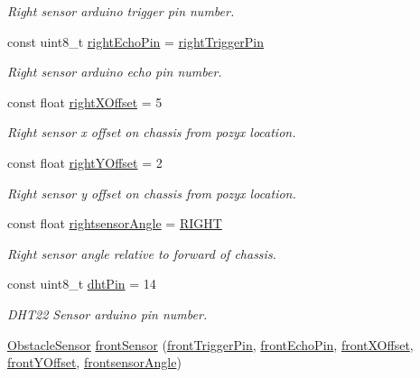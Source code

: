 \begin{DoxyCompactItemize}
\begin{DoxyCompactList}\small\item\em Right sensor arduino trigger pin number. \end{DoxyCompactList}\item 
const uint8\+\_\+t \mbox{\hyperlink{bot_main_8ino_a513a215c9894c01e37f389b072c5cec4}{right\+Echo\+Pin}} = \mbox{\hyperlink{bot_main_8ino_a906054d9d48970211789ac841d331898}{right\+Trigger\+Pin}}
\begin{DoxyCompactList}\small\item\em Right sensor arduino echo pin number. \end{DoxyCompactList}\item 
const float \mbox{\hyperlink{bot_main_8ino_ac932cddb5bc68094c96d0034c92faef9}{right\+X\+Offset}} = 5
\begin{DoxyCompactList}\small\item\em Right sensor x offset on chassis from pozyx location. \end{DoxyCompactList}\item 
const float \mbox{\hyperlink{bot_main_8ino_a07903b96b48e8e456debd9cc43c7af05}{right\+Y\+Offset}} = 2
\begin{DoxyCompactList}\small\item\em Right sensor y offset on chassis from pozyx location. \end{DoxyCompactList}\item 
const float \mbox{\hyperlink{bot_main_8ino_a83724535498f068d5b44150a2bc4fcf8}{rightsensor\+Angle}} = \mbox{\hyperlink{bot_main_8ino_a80fb826a684cf3f0d306b22aa100ddac}{R\+I\+G\+HT}}
\begin{DoxyCompactList}\small\item\em Right sensor angle relative to forward of chassis. \end{DoxyCompactList}\item 
const uint8\+\_\+t \mbox{\hyperlink{bot_main_8ino_a89e40ffdf0114ea60292ff57879491e2}{dht\+Pin}} = 14
\begin{DoxyCompactList}\small\item\em D\+H\+T22 Sensor arduino pin number. \end{DoxyCompactList}\item 
\mbox{\hyperlink{class_obstacle_sensor}{Obstacle\+Sensor}} \mbox{\hyperlink{bot_main_8ino_a355879266d10af4a6e9126a47bc09113}{front\+Sensor}} (\mbox{\hyperlink{bot_main_8ino_a33df7a8dbfd90327fda79c01f944f56a}{front\+Trigger\+Pin}}, \mbox{\hyperlink{bot_main_8ino_a878ae4b68ec48fc902c4aa953ad565b4}{front\+Echo\+Pin}}, \mbox{\hyperlink{bot_main_8ino_abdd898a2dfa2f64e2821af36c6ed3724}{front\+X\+Offset}}, \mbox{\hyperlink{bot_main_8ino_a4919465d0182f44aa7acaa39ece1e17a}{front\+Y\+Offset}}, \mbox{\hyperlink{bot_main_8ino_ad681cfe410d5d764c513368773b9de93}{frontsensor\+Angle}})

\end{DoxyCompactItemize}
